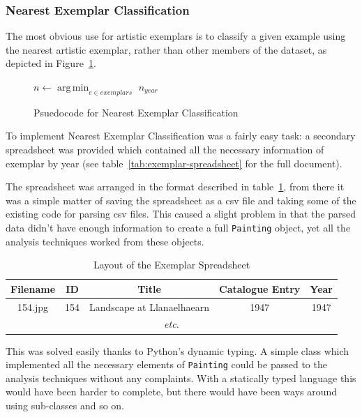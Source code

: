 \subsubsection{Nearest Exemplar Classification}
The most obvious use for artistic exemplars is to classify a given example using the nearest 
artistic exemplar, rather than other members of the dataset, as depicted in 
Figure~\ref{fig:nearest-exemplar}.

\begin{figure}[h]
\begin{algorithmic}
\State $n \gets \operatorname*{arg\,min}_{e \in exemplars}$ 
\State \Return $n_{year}$
\EndFunction
\end{algorithmic}
\caption{Psuedocode for Nearest Exemplar Classification}\label{fig:nearest-exemplar}
\end{figure}

To implement Nearest Exemplar Classification was a fairly easy task: a secondary spreadsheet was 
provided which contained all the necessary information of exemplar by year (see 
table~\ref{tab:exemplar-spreadsheet} for the full document).

The spreadsheet was arranged in the format described in table~\ref{tab:exemplar-layout}, from
there it was a simple matter of saving the spreadsheet as a \gls{csv} file and taking some of the
existing code for parsing \gls{csv} files. This caused a slight problem in that the parsed data
didn't have enough information to create a full \texttt{Painting} object, yet all the analysis
techniques worked from these objects.

\begin{table}[h]
\centering
\begin{tabular}{|c|c|c|c|c|} \hline
Filename & ID  & Title                      & Catalogue Entry & Year \\\hline
154.jpg  & 154 & Landscape at Llanaelhaearn & 1947            & 1947 \\\hline
\multicolumn{5}{|c|}{\textit{etc.}}\\\hline
\end{tabular}
\caption{Layout of the Exemplar Spreadsheet}\label{tab:exemplar-layout}
\end{table}

This was solved easily thanks to Python's dynamic typing. A simple class which implemented all the
necessary elements of \texttt{Painting} could be passed to the analysis techniques without any
complaints. With a statically typed language this would have been harder to complete, but there
would have been ways around using sub-classes and so on.

